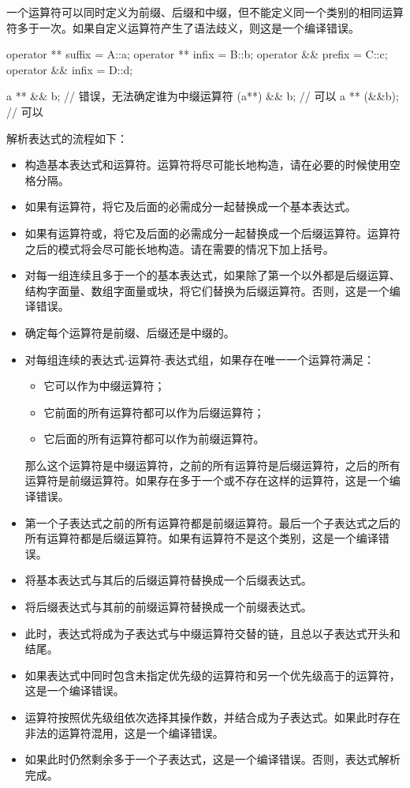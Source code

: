 \pnum
一个运算符可以同时定义为前缀、后缀和中缀，但不能定义同一个类别的相同运算符多于一次。如果自定义运算符产生了语法歧义，则这是一个编译错误。

\enterexample
\begin{codeblock}
operator ** suffix = A::a;
operator ** infix = B::b;
operator && prefix = C::c;
operator && infix = D::d;

a ** && b; // 错误，无法确定谁为中缀运算符
(a**) && b; // 可以
a ** (&&b); // 可以
\end{codeblock}
\exitexample

\pnum
解析表达式的流程如下：

\begin{itemize}
    \item 构造基本表达式和运算符。运算符将尽可能长地构造，请在必要的时候使用空格分隔。
    \item 如果有运算符，将它及后面的必需成分一起替换成一个基本表达式。
    \item 如果有运算符或，将它及后面的必需成分一起替换成一个后缀运算符。\enternote {}运算符之后的模式将会尽可能长地构造。请在需要的情况下加上括号。\exitnote
    \item 对每一组连续且多于一个的基本表达式，如果除了第一个以外都是后缀运算、结构字面量、数组字面量或块，将它们替换为后缀运算符。否则，这是一个编译错误。
    \item 确定每个运算符是前缀、后缀还是中缀的。
    \item 对每组连续的表达式-运算符-表达式组，如果存在唯一一个运算符满足：
    \begin{itemize}
        \item 它可以作为中缀运算符；
        \item 它前面的所有运算符都可以作为后缀运算符；
        \item 它后面的所有运算符都可以作为前缀运算符。
    \end{itemize}
    那么这个运算符是中缀运算符，之前的所有运算符是后缀运算符，之后的所有运算符是前缀运算符。如果存在多于一个或不存在这样的运算符，这是一个编译错误。
    \item 第一个子表达式之前的所有运算符都是前缀运算符。最后一个子表达式之后的所有运算符都是后缀运算符。如果有运算符不是这个类别，这是一个编译错误。
    \item 将基本表达式与其后的后缀运算符替换成一个后缀表达式。
    \item 将后缀表达式与其前的前缀运算符替换成一个前缀表达式。
    \item 此时，表达式将成为子表达式与中缀运算符交替的链，且总以子表达式开头和结尾。
    \item 如果表达式中同时包含未指定优先级的运算符和另一个优先级高于\tcode{==}的运算符，这是一个编译错误。
    \item 运算符按照优先级组依次选择其操作数，并结合成为子表达式。如果此时存在非法的运算符混用，这是一个编译错误。
    \item 如果此时仍然剩余多于一个子表达式，这是一个编译错误。否则，表达式解析完成。
\end{itemize}

